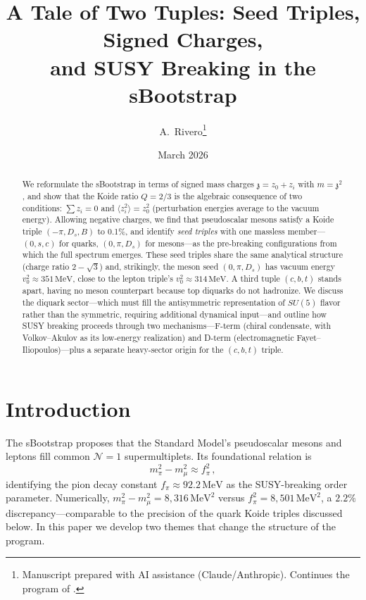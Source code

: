 \documentclass[12pt,a4paper]{article}
\title{A Tale of Two Tuples: Seed Triples, Signed Charges, \\
and SUSY Breaking in the sBootstrap}
\author{A.~Rivero\thanks{Manuscript prepared with AI assistance (Claude/Anthropic). 
Continues the program of \cite{Rivero2005,Rivero2012}.}}
\date{March 2026}
\newcommand{\MeV}{\,\text{MeV}}
\newcommand{\zch}{\mathfrak{z}}
\begin{document}
\maketitle

\begin{abstract}
We reformulate the sBootstrap in terms of signed mass charges 
$\zch = z_0 + z_i$ with $m = \zch^2$, and show that the Koide ratio 
$Q = 2/3$ is the algebraic consequence of two conditions: 
$\sum z_i = 0$ and $\langle z_i^2\rangle = z_0^2$ (perturbation 
energies average to the vacuum energy). Allowing negative charges, 
we find that pseudoscalar mesons satisfy a Koide triple 
$(-\pi, D_s, B)$ to 0.1\%, and identify \emph{seed triples} with 
one massless member---$(0, s, c)$ for quarks, $(0, \pi, D_s)$ for 
mesons---as the pre-breaking configurations from which the full 
spectrum emerges. These seed triples share the same analytical 
structure (charge ratio $2-\sqrt{3}$) and, strikingly, the meson 
seed $(0,\pi,D_s)$ has vacuum energy $v_0^2 \approx 351\MeV$, 
close to the lepton triple's $v_0^2 \approx 314\MeV$. A third 
tuple $(c,b,t)$ stands apart, having no meson counterpart because 
top diquarks do not hadronize. We discuss the diquark sector---which 
must fill the antisymmetric representation of $SU(5)$ flavor rather 
than the symmetric, requiring additional dynamical input---and outline 
how SUSY breaking proceeds through two mechanisms---F-term (chiral 
condensate, with Volkov--Akulov as its low-energy realization) and 
D-term (electromagnetic Fayet--Iliopoulos)---plus a separate 
heavy-sector origin for the $(c,b,t)$ triple.
\end{abstract}

\tableofcontents

\section{Introduction}
\label{sec:intro}

The sBootstrap \cite{Rivero2005,Rivero2012} proposes that the Standard 
Model's pseudoscalar mesons and leptons fill common $\mathcal{N}=1$ 
supermultiplets. Its foundational relation is
\begin{equation}
\label{eq:pimu}
m_\pi^2 - m_\mu^2 \approx f_\pi^2\,,
\end{equation}
identifying the pion decay constant $f_\pi \approx 92.2\MeV$ as the 
SUSY-breaking order parameter. Numerically, $m_\pi^2 - m_\mu^2 = 
8{,}316\MeV^2$ versus $f_\pi^2 = 8{,}501\MeV^2$, a $2.2\%$ 
discrepancy---comparable to the precision of the quark Koide triples 
discussed below. In this paper we develop two themes 
that change the structure of the program.
\end{document}
